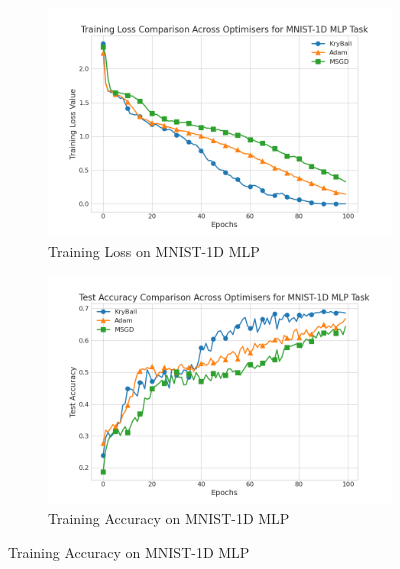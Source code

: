 \begin{figure}[!t]
    \centering
    \begin{subfigure}[b]{0.48\linewidth}  %
        \centering
        \includegraphics[width=\linewidth]{figures/5evals/mnist1d_mlp_loss.png}
        \caption{Training Loss on MNIST-1D MLP}
        \label{fig:mnist1d_mlp_loss}
    \end{subfigure}
    \begin{subfigure}[b]{0.48\linewidth}
        \centering
        \includegraphics[width=\linewidth]{figures/5evals/mnist1d_mlp_acc.png}
        \caption{Training Accuracy on MNIST-1D MLP}
        \label{fig:mnist1d_mlp_acc}
    \end{subfigure}
    
    \vspace{1em}  %
    

\end{figure}
